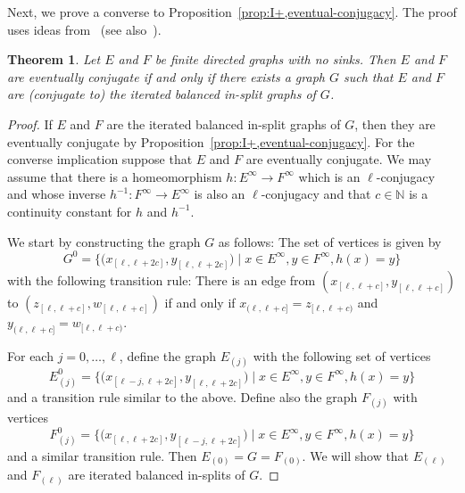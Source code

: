 \documentclass[12pt,a4paper,oneside,reqno,final]{amsart}
\newcommand{\LRA}{\longrightarrow}
\newcommand{\N}{\mathbb{N}}
\newtheorem{theorem}[lemma]{Theorem}
\theoremstyle{definition}
\numberwithin{equation}{section} %
\begin{document}
Next, we prove a converse to Proposition~\ref{prop:I+,eventual-conjugacy}.
The proof uses ideas from~\cite[Section 2]{Boyle-Franks-Kitchens} (see also~\cite[Chapter 2]{Kitchens}).


\begin{theorem}\label{thm:ec-iterated-balanced}
    Let $E$ and $F$ be finite directed graphs with no sinks.
    Then $E$ and $F$ are eventually conjugate if and only if 
    there exists a graph $G$ such that $E$ and $F$ are (conjugate to) the iterated balanced in-split graphs of $G$.
\end{theorem}

\begin{proof}
    If $E$ and $F$ are the iterated balanced in-split graphs of $G$, then they are eventually conjugate by Proposition~\ref{prop:I+,eventual-conjugacy}.
    For the converse implication suppose that $E$ and $F$ are eventually conjugate.
    We may assume that there is a homeomorphism $h\colon E^\infty \LRA F^\infty$ which is an $\ell$-conjugacy and 
    whose inverse $h^{-1}\colon F^\infty \LRA E^\infty$ is also an $\ell$-conjugacy
    and that $c\in \N$ is a continuity constant for $h$ and $h^{-1}$.

    We start by constructing the graph $G$ as follows:
    The set of vertices is given by 
    \[
        G^0 = \{ \big(x_{[\ell, \ell + 2c]}, y_{[\ell, \ell + 2c]}\big) \mid x\in E^\infty, y\in F^\infty,  h(x) = y\}
    \]
    with the following transition rule:
    There is an edge from $(x_{[\ell, \ell + c]}, y_{[\ell, \ell + c]})$ to $(z_{[\ell, \ell + c]}, w_{[\ell, \ell + c]})$ 
    if and only if $x_{(\ell, \ell + c]} = z_{[\ell, \ell + c)}$ and $y_{(\ell, \ell + c]} = w_{[\ell, \ell + c)}$.

    For each $j = 0,\ldots,\ell$, define the graph $E_{(j)}$ with the following set of vertices
    \[
        E_{(j)}^0 = \{ \big(x_{[\ell - j, \ell + 2c]}, y_{[\ell, \ell + 2c]}\big) \mid x\in E^\infty, y\in F^\infty,  h(x) = y \}
    \]
    and a transition rule similar to the above.
    Define also the graph $F_{(j)}$ with vertices
    \[
        F_{(j)}^0 = \{ \big(x_{[\ell, \ell + 2c]}, y_{[\ell - j, \ell + 2c]}\big) \mid x\in E^\infty, y\in F^\infty,  h(x) = y \}
    \]
    and a similar transition rule.
    Then $E_{(0)} = G = F_{(0)}$.
    We will show that $E_{(\ell)}$ and $F_{(\ell)}$ are iterated balanced in-splits of $G$.


\end{proof}
\end{document}
